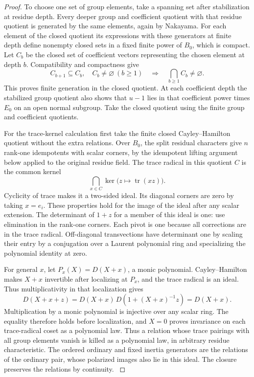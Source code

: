 \begin{proof}
To choose one
set of group elements, take a spanning set after stabilization
at residue depth. Every deeper group and coefficient quotient
with that residue quotient is generated by the same elements,
again by Nakayama. For each element of the closed quotient
its expressions with these generators at finite depth define
nonempty closed sets in a fixed finite power of \(B_0\),
which is compact. Let \(C_b\) be the closed set of coefficient vectors representing the chosen element at depth \(b\). Compatibility and compactness give
\[
 C_{b+1}\subseteq C_b,\quad C_b\ne\varnothing\ (b\ge1)\quad\Longrightarrow\quad \bigcap_{b\ge1} C_b\ne\varnothing .
\] This proves finite generation in the closed quotient.
At each coefficient depth the stabilized group quotient
also shows that \(u-1\) lies in that coefficient power times
\(E_0\) on an open normal subgroup.  Take the closed quotient using the finite group and coefficient quotients. \label{cor:ordinary-patching-matrices-3}

For the trace-kernel calculation first take the finite
closed Cayley--Hamilton quotient without the extra
relations. Over \(B_0\), the split residual characters
give \(n\) rank-one idempotents with scalar corners,
by the idempotent lifting argument below applied to
the original residue field. The trace radical in this quotient \(C\) is the common kernel
\[
 \bigcap_{x\in C}\ker\bigl(z\longmapsto\operatorname{tr}(xz)\bigr).
\]
Cyclicity of trace makes it a two-sided ideal. Its diagonal corners are
zero by taking \(x=e_i\). These properties hold for the
image of the ideal after any scalar extension. The
determinant of \(1+z\) for a member of this ideal is
one: use elimination in the rank-one corners. Each pivot
is one because all corrections are in the trace radical.
Off-diagonal transvections have determinant one by scaling
their entry by a conjugation over a Laurent polynomial
ring and specializing the polynomial identity at zero.

For general \(x\), let \(P_x(X)=D(X+x)\), a monic
polynomial. Cayley--Hamilton makes \(X+x\) invertible after
localizing at \(P_x\), and the trace radical is an ideal.
Thus multiplicativity in that localization gives
\[
 D(X+x+z)=D(X+x)\,
                  D(1+(X+x)^{-1}z)=D(X+x).
\]
Multiplication by a monic polynomial is injective over
any scalar ring. The equality therefore holds before
localization, and \(X=0\) proves invariance on each
trace-radical coset as a polynomial law. Thus a relation whose trace pairings
with all group elements vanish is killed as a polynomial
law, in arbitrary residue characteristic.
 The ordered ordinary and fixed inertia
generators are the relations of the ordinary pair, whose
polarized images also lie in this ideal. The closure
preserves the relations by continuity. \label{cor:ordinary-patching-matrices-4}


\end{proof}
